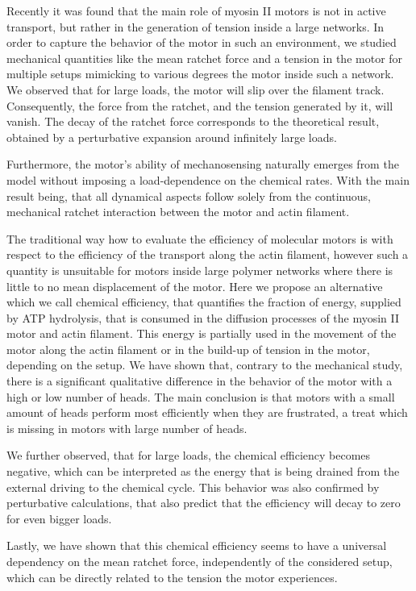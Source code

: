 \documentclass[aps,pre,twocolumn,showpacs,showkeys,superscriptaddress,floatfix]{revtex4-1}
\begin{document}
Recently it was found that the main role of myosin II motors is not in active transport, but rather in the generation of tension inside a large networks. 
In order to capture the behavior of the motor in such an environment,    
we studied mechanical quantities like the mean ratchet force and a tension in the motor for multiple setups mimicking to various degrees the motor inside such a network.
We observed that for large loads, the motor will slip over the filament track. 
Consequently, the force from the ratchet, and the tension generated by it, will vanish.
The decay of the ratchet force corresponds to the theoretical result, obtained by a perturbative expansion around infinitely large loads.

Furthermore, the motor's ability of mechanosensing naturally emerges from the model without imposing a load-dependence on the chemical rates.
With the main result being, that all dynamical aspects follow solely from the continuous, mechanical ratchet interaction between the motor and actin filament.

The traditional way how to evaluate the efficiency of molecular motors is with respect to the efficiency of the transport along the actin filament,
however such a quantity is unsuitable for motors inside large polymer networks where there is little to no mean displacement of the motor. 
Here we propose an alternative which we call chemical efficiency, that quantifies the fraction of energy, supplied by ATP hydrolysis, 
that is consumed in the diffusion processes of the myosin II motor and actin filament.
This energy is partially used in the movement of the motor along the actin filament or in the build-up of tension in the motor, depending on the setup. 
We have shown that, contrary to the mechanical study, there is a significant qualitative difference in the behavior of the motor with a high or low number of heads. 
The main conclusion is that motors with a small amount of heads perform most efficiently when they are frustrated, a treat which is missing in motors with large number of heads.

We further observed, that for large loads, the chemical efficiency becomes negative, 
which can be interpreted as the energy that is being drained from the external driving to the chemical cycle.
This behavior was also confirmed by perturbative calculations, that also predict that the efficiency will decay to zero for even bigger loads.

Lastly, we have shown that this chemical efficiency seems to have a universal dependency on the mean ratchet force, independently of the considered setup,
which can be directly related to the tension the motor experiences. 
\end{document}
